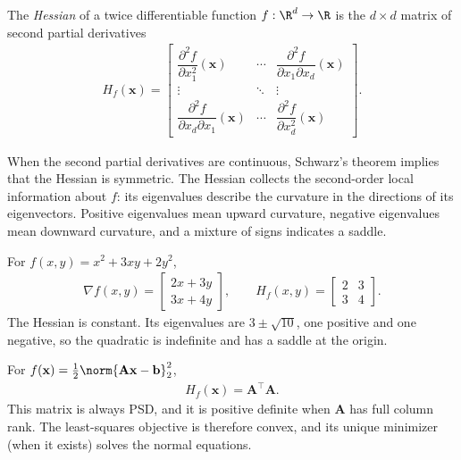 \documentclass[a4paper, 12pt]{book}
\begin{document}
\begin{definition}
    The \emph{Hessian} of a twice differentiable function
    $f : \R^d \to \R$ is the $d \times d$ matrix of second partial derivatives
    \begin{align}
        H_f(\mathbf{x}) =
        \begin{bmatrix}
            \dfrac{\partial^2 f}{\partial x_1^2}(\mathbf{x}) &
            \cdots &
            \dfrac{\partial^2 f}{\partial x_1\partial x_d}(\mathbf{x})\\
            \vdots & \ddots & \vdots\\
            \dfrac{\partial^2 f}{\partial x_d\partial x_1}(\mathbf{x}) &
            \cdots &
            \dfrac{\partial^2 f}{\partial x_d^2}(\mathbf{x})
        \end{bmatrix}.
    \end{align}
\end{definition}
When the second partial derivatives are continuous, Schwarz's theorem implies that
the Hessian is symmetric. The Hessian collects the second-order local information
about $f$: its eigenvalues describe the curvature in the directions of its
eigenvectors. Positive eigenvalues mean upward curvature, negative eigenvalues mean
downward curvature, and a mixture of signs indicates a saddle.

\begin{example}
    For $f(x,y)=x^2+3xy+2y^2$,
    \begin{align}
        \nabla f(x,y) = \begin{bmatrix}2x+3y\\3x+4y\end{bmatrix},
        \qquad
        H_f(x,y) = \begin{bmatrix}2&3\\3&4\end{bmatrix}.
    \end{align}
    The Hessian is constant. Its eigenvalues are $3\pm\sqrt{10}$, one positive and
    one negative, so the quadratic is indefinite and has a saddle at the origin.
\end{example}

\begin{example}
    For $f(\mathbf{x})=\frac12\norm{\mathbf{A}\mathbf{x}-\mathbf{b}}_2^2$,
    \begin{align}
        H_f(\mathbf{x}) = \mathbf{A}^\top\mathbf{A}.
    \end{align}
    This matrix is always PSD, and it is positive definite when $\mathbf{A}$ has full
    column rank. The least-squares objective is therefore convex, and its unique
    minimizer (when it exists) solves the normal equations.
\end{example}
\end{document}
